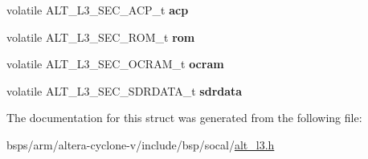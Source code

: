 \begin{DoxyCompactItemize}
volatile A\+L\+T\+\_\+\+L3\+\_\+\+S\+E\+C\+\_\+\+A\+C\+P\+\_\+t {\bfseries acp}
\item 
\mbox{\label{structALT__L3__SECGRP__s_ad0544a4fe9a460027e2eef2c2c2183c5}} 
volatile A\+L\+T\+\_\+\+L3\+\_\+\+S\+E\+C\+\_\+\+R\+O\+M\+\_\+t {\bfseries rom}
\item 
\mbox{\label{structALT__L3__SECGRP__s_aba4555b387bbffac80c88f1dbda99ee3}} 
volatile A\+L\+T\+\_\+\+L3\+\_\+\+S\+E\+C\+\_\+\+O\+C\+R\+A\+M\+\_\+t {\bfseries ocram}
\item 
\mbox{\label{structALT__L3__SECGRP__s_ae012a27a59bd0ebb4db257fbea72b07c}} 
volatile A\+L\+T\+\_\+\+L3\+\_\+\+S\+E\+C\+\_\+\+S\+D\+R\+D\+A\+T\+A\+\_\+t {\bfseries sdrdata}
\end{DoxyCompactItemize}


The documentation for this struct was generated from the following file\+:\begin{DoxyCompactItemize}
\item 
bsps/arm/altera-\/cyclone-\/v/include/bsp/socal/\mbox{\hyperlink{alt__l3_8h}{alt\+\_\+l3.\+h}}\end{DoxyCompactItemize}
